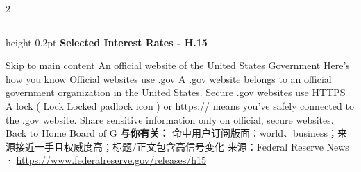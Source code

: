 \documentclass[10.5pt]{ctexart}
\begin{document}
\begin{multicols}{2}
\vspace{2mm}
\hrule height 0.2pt
\vspace{2mm}
{\large\bfseries Selected Interest Rates - H.15}\par
Skip to main content An official website of the United States Government Here's how you know Official websites use .gov A .gov website belongs to an official government organization in the United States. Secure .gov websites use HTTPS A lock ( Lock Locked padlock icon ) or https:// means you've safely connected to the .gov website. Share sensitive information only on official, secure websites. Back to Home Board of G
\textbf{与你有关：} 命中用户订阅版面：world、business；来源接近一手且权威度高；标题/正文包含高信号变化
{\footnotesize\color{ormuted} 来源：Federal Reserve News · \url{https://www.federalreserve.gov/releases/h15}}
\end{multicols}
\end{document}
